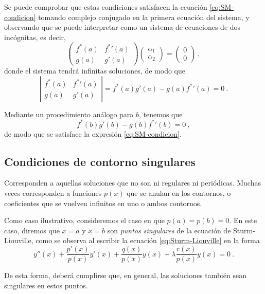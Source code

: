 Se puede comprobar que estas condiciones satisfacen la ecuación \eqref{eq:SM-condicion} tomando complejo conjugado en la primera ecuación del sistema, y observando que se puede interpretar como un sistema de ecuaciones de dos incógnitas, es decir,
\begin{equation}
    \begin{pmatrix}
        f^\ast(a) & {f^\ast}'(a) \\ g(a) & g'(a)
    \end{pmatrix}
    \begin{pmatrix}
        \alpha_1 \\ \alpha_2
    \end{pmatrix}
    = 
    \begin{pmatrix}
        0 \\ 0
    \end{pmatrix} \ ,
\end{equation}
donde el sistema tendrá infinitas soluciones, de modo que
\begin{equation}
    \left| \begin{array}{cc}
        f^\ast(a) & {f^\ast}'(a) \\ g(a) & g'(a)
    \end{array}
    \right| = f^\ast(a) g'(a) - g(a) {f^\ast}'(a) = 0 \ .
\end{equation}

Mediante un procedimiento análogo para $b$, tenemos que
\begin{equation}
    f^\ast(b) g'(b) - g(b) {f^\ast}'(b) = 0 \ ,
\end{equation}
de modo que se satisface la expresión \eqref{eq:SM-condicion}.

\subsection{Condiciones de contorno singulares}

Corresponden a aquellas soluciones que no son ni regulares ni periódicas. Muchas veces corresponden a funciones $p(x)$ que se anulan en los contornos, o coeficientes que se vuelven infinitos en uno o ambos contornos.

Como caso ilustrativo, consideremos el caso en que $p(a) = p(b) = 0$. En este caso, diremos que $x=a$ y $x=b$ son \emph{puntos singulares} de la ecuación de Sturm-Liouville, como se observa al escribir la ecuación \eqref{eq:Sturm-Liouville} en la forma
\begin{equation}
    y''(x) + \frac{p'(x)}{p(x)} y'(x) + \frac{q(x)}{p(x)} y(x) + \lambda \frac{r(x)}{p(x)} y(x) = 0 \ .
\end{equation}

De esta forma, deberá cumplirse que, en general, las soluciones también sean singulares en estos puntos.